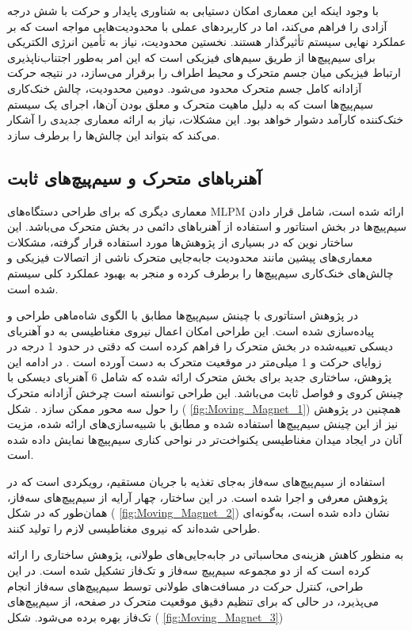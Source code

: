 با وجود اینکه این معماری امکان دستیابی به شناوری پایدار و حرکت با شش درجه آزادی را فراهم می‌کند، اما در کاربردهای عملی با محدودیت‌هایی مواجه است که بر عملکرد نهایی سیستم تأثیرگذار هستند. نخستین محدودیت، نیاز به تأمین انرژی الکتریکی برای سیم‌پیچ‌ها از طریق سیم‌های فیزیکی است که این امر به‌طور اجتناب‌ناپذیری ارتباط فیزیکی میان جسم متحرک و محیط اطراف را برقرار می‌سازد، در نتیجه حرکت آزادانه کامل جسم متحرک محدود می‌شود. دومین محدودیت، چالش خنک‌کاری سیم‌پیچ‌ها است که به دلیل ماهیت متحرک و معلق بودن آن‌ها، اجرای یک سیستم خنک‌کننده کارآمد دشوار خواهد بود. این مشکلات، نیاز به ارائه معماری جدیدی را آشکار می‌کند که بتواند این چالش‌ها را برطرف سازد.

\subsection{‌آهنرباهای متحرک و سیم‌پیچ‌های ثابت}

معماری دیگری که برای طراحی دستگاه‌های MLPM ارائه شده است، شامل قرار دادن سیم‌پیچ‌ها در بخش استاتور و استفاده از آهنرباهای دائمی در بخش متحرک می‌باشد. این ساختار نوین که در بسیاری از پژوهش‌ها مورد استفاده قرار گرفته، مشکلات معماری‌های پیشین مانند محدودیت جابه‌جایی متحرک ناشی از اتصالات فیزیکی و چالش‌های خنک‌کاری سیم‌پیچ‌ها را برطرف کرده و منجر به بهبود عملکرد کلی سیستم شده است.

در پژوهش 
\cite{RN7}
 استاتوری با چینش سیم‌پیچ‌ها مطابق با الگوی شاه‌ماهی
 طراحی و پیاده‌سازی شده است. این طراحی امکان اعمال نیروی مغناطیسی به دو آهنربای دیسکی تعبیه‌شده در بخش متحرک را فراهم کرده است که دقتی در حدود 1 درجه در زوایای حرکت و 1 میلی‌متر در موقعیت متحرک به دست آورده است
\cite{RN7}
. در ادامه این پژوهش، ساختاری جدید برای بخش متحرک ارائه شده که شامل 6 آهنربای دیسکی با چینش کروی و فواصل ثابت می‌باشد. این طراحی توانسته است چرخش آزادانه متحرک را حول سه محور ممکن سازد 
\cite{RN39}.
شکل (
\ref{fig:Moving_Magnet_1})
همچنین در پژوهش 
\cite{RN62}
 نیز از این چینش سیم‌پیچ‌ها استفاده شده و مطابق با شبیه‌سازی‌های ارائه شده، مزیت آنان در ایجاد میدان مغناطیسی یکنواخت‌تر در نواحی کناری سیم‌پیچ‌ها نمایش داده شده است.

استفاده از سیم‌پیچ‌های سه‌فاز به‌جای تغذیه با جریان مستقیم، رویکردی است که در پژوهش 
\cite{RN24}
معرفی و اجرا شده است. در این ساختار، چهار آرایه از سیم‌پیچ‌های سه‌فاز، همان‌طور که در 
شکل (
\ref{fig:Moving_Magnet_2})
 نشان داده شده است، به‌گونه‌ای طراحی شده‌اند که نیروی مغناطیسی لازم را تولید کنند.

به ‌منظور کاهش هزینه‌ی محاسباتی در جابه‌جایی‌های طولانی، پژوهش 
\cite{RN32}
 ساختاری را ارائه کرده است که از دو مجموعه سیم‌پیچ‌ سه‌فاز و تک‌فاز تشکیل شده است. در این طراحی، کنترل حرکت در مسافت‌های طولانی توسط سیم‌پیچ‌های سه‌فاز انجام می‌پذیرد، در حالی که برای تنظیم دقیق موقعیت متحرک در صفحه، از سیم‌پیچ‌های تک‌فاز بهره برده می‌شود.
شکل (
\ref{fig:Moving_Magnet_3})

